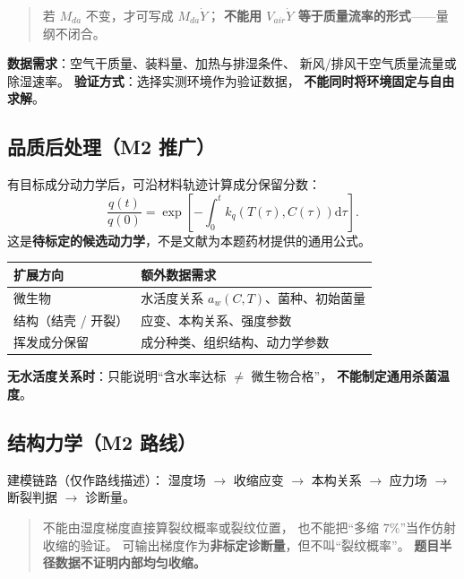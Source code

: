 \begin{quote}
  若 $M_{da}$ 不变，才可写成 $M_{da}\dot Y$；
  \textbf{不能用 $V_{air}\dot Y$ 等于质量流率的形式}——量纲不闭合。
\end{quote}

\textbf{数据需求}：空气干质量、装料量、加热与排湿条件、
新风/排风干空气质量流量或除湿速率。
\textbf{验证方式}：选择实测环境作为验证数据，
\textbf{不能同时将环境固定与自由求解}。

\subsection{品质后处理（M2 推广）}

有目标成分动力学后，可沿材料轨迹计算成分保留分数：
\begin{equation}
  \frac{q(t)}{q(0)}=\exp\left[-\int_0^t k_q\!\left(T(\tau),C(\tau)\right)\mathrm d\tau\right].
\end{equation}
这是\textbf{待标定的候选动力学}，不是文献为本题药材提供的通用公式。

\begin{table}[H]
  \centering
  \footnotesize
  \begin{tabular}{@{}ll@{}}
    \toprule
    扩展方向 & 额外数据需求 \\
    \midrule
    微生物 & 水活度关系 $a_w(C,T)$、菌种、初始菌量 \\
    结构（结壳 / 开裂） & 应变、本构关系、强度参数 \\
    挥发成分保留 & 成分种类、组织结构、动力学参数 \\
    \bottomrule
  \end{tabular}
\end{table}

\textbf{无水活度关系时}：只能说明``含水率达标 $\ne$ 微生物合格''，
\textbf{不能制定通用杀菌温度}。

\subsection{结构力学（M2 路线）}

建模链路（仅作路线描述）：
湿度场 $\to$ 收缩应变 $\to$ 本构关系 $\to$ 应力场 $\to$ 断裂判据 $\to$ 诊断量。

\begin{quote}
  不能由湿度梯度直接算裂纹概率或裂纹位置，
  也不能把``多缩 $7\%$''当作仿射收缩的验证。
  可输出梯度作为\textbf{非标定诊断量}，但不叫``裂纹概率''。
  \textbf{题目半径数据不证明内部均匀收缩。}
\end{quote}
